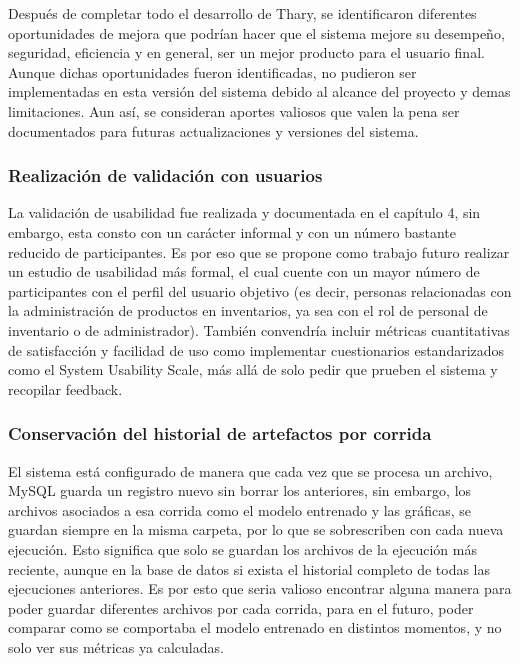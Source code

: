 Después de completar todo el desarrollo de Thary, se identificaron diferentes oportunidades de mejora que podrían hacer que el sistema mejore su desempeño, seguridad, eficiencia y en general, ser un mejor producto para el usuario final. Aunque dichas oportunidades fueron identificadas, no pudieron ser implementadas en esta versión del sistema debido al alcance del proyecto y demas limitaciones. Aun así, se consideran aportes valiosos que valen la pena ser documentados para futuras actualizaciones y versiones del sistema.


\subsubsection{Realización de validación con usuarios}

La validación de usabilidad fue realizada y documentada en el capítulo 4, sin embargo, esta consto con un carácter informal y con un número bastante reducido de participantes. Es por eso que se propone como trabajo futuro realizar un estudio de usabilidad más formal, el cual cuente con un mayor número de participantes con el perfil del usuario objetivo (es decir, personas relacionadas con la administración de productos en inventarios, ya sea con el rol de personal de inventario o de administrador). También convendría incluir métricas cuantitativas de satisfacción y facilidad de uso como implementar cuestionarios estandarizados como el System Usability Scale, más allá de solo pedir que prueben el sistema y recopilar feedback.


\subsubsection{Conservación del historial de artefactos por corrida}

El sistema está configurado de manera que cada vez que se procesa un archivo, MySQL guarda un registro nuevo sin borrar los anteriores, sin embargo, los archivos asociados a esa corrida como el modelo entrenado y las gráficas, se guardan siempre en la misma carpeta, por lo que se sobrescriben con cada nueva ejecución. Esto significa que solo se guardan los archivos de la ejecución más reciente, aunque en la base de datos si exista el historial completo de todas las ejecuciones anteriores.
Es por esto que seria valioso encontrar alguna manera para poder guardar diferentes archivos por cada corrida, para en el futuro, poder comparar como se comportaba el modelo entrenado en distintos momentos, y no solo ver sus métricas ya calculadas.

